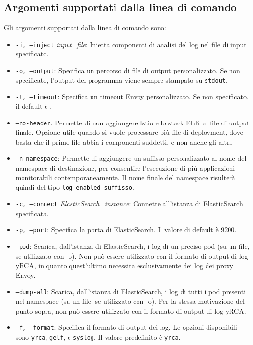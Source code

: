 \subsection{Argomenti supportati dalla linea di comando}
Gli argomenti supportati dalla linea di comando sono:

\begin{itemize}

\item \texttt{-i, --inject} \textit{input\_file}: Inietta componenti di analisi del log nel file di input specificato.
    
\item \texttt{-o, --output}: Specifica un percorso di file di output personalizzato. Se non specificato, l'output del programma viene sempre stampato su \texttt{stdout}.

\item \texttt{-t, --timeout}: Specifica un timeout Envoy personalizzato. Se non specificato, il default è .

\item \texttt{--no-header}: Permette di non aggiungere Istio e lo stack ELK al file di output finale. Opzione utile quando si vuole processare più file di deployment, dove basta che il primo file abbia i componenti suddetti, e non anche gli altri.

\item \texttt{-n namespace}: Permette di aggiungere un suffisso personalizzato al nome del namespace di destinazione, per consentire l'esecuzione di più applicazioni monitorabili contemporaneamente. Il nome finale del namespace risulterà quindi del tipo \texttt{log-enabled-suffisso}.

\item \texttt{-c, --connect} \textit{ElasticSearch\_instance}: Connette all'istanza di ElasticSearch specificata.

\item \texttt{-p, --port}: Specifica la porta di ElasticSearch. Il valore di default è 9200.

\item \texttt{--pod}: Scarica, dall'istanza di ElasticSearch, i log di un preciso pod (su un file, se utilizzato con -o). Non può essere utilizzato con il formato di output di log yRCA, in quanto quest'ultimo necessita esclusivamente dei log dei proxy Envoy.

\item \texttt{--dump-all}: Scarica, dall'istanza di ElasticSearch, i log di tutti i pod presenti nel namespace (su un file, se utilizzato con -o). Per la stessa motivazione del punto sopra, non può essere utilizzato con il formato di output di log yRCA.

\item \texttt{-f, --format}: Specifica il formato di output dei log. Le opzioni disponibili sono \texttt{yrca}, \texttt{gelf}, e \texttt{syslog}. Il valore predefinito è \texttt{yrca}.
\end{itemize}



